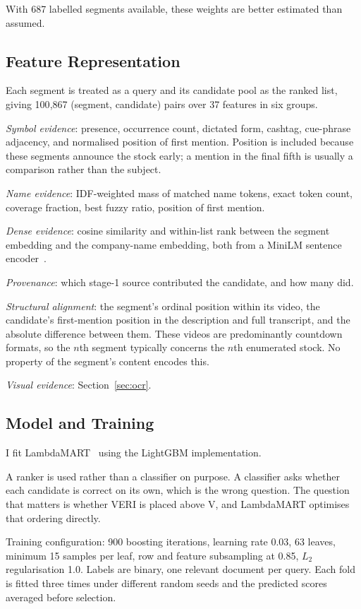 \documentclass[conference]{IEEEtran}
\begin{document}
With 687 labelled segments available, these weights are better estimated than
assumed.

\subsection{Feature Representation}

Each segment is treated as a query and its candidate pool as the ranked list,
giving 100{,}867 (segment, candidate) pairs over 37 features in six groups.

\emph{Symbol evidence}: presence, occurrence count, dictated form, cashtag,
cue-phrase adjacency, and normalised position of first mention. Position is
included because these segments announce the stock early; a mention in the final
fifth is usually a comparison rather than the subject.

\emph{Name evidence}: IDF-weighted mass of matched name tokens, exact token
count, coverage fraction, best fuzzy ratio, position of first mention.

\emph{Dense evidence}: cosine similarity and within-list rank between the
segment embedding and the company-name embedding, both from a MiniLM sentence
encoder~\cite{minilm}.

\emph{Provenance}: which stage-1 source contributed the candidate, and how many
did.

\emph{Structural alignment}: the segment's ordinal position within its video,
the candidate's first-mention position in the description and full transcript,
and the absolute difference between them. These videos are predominantly
countdown formats, so the $n$th segment typically concerns the $n$th enumerated
stock. No property of the segment's content encodes this.

\emph{Visual evidence}: Section~\ref{sec:ocr}.

\subsection{Model and Training}

I fit LambdaMART~\cite{lambdamart} using the LightGBM implementation.

A ranker is used rather than a classifier on purpose. A classifier asks whether
each candidate is correct on its own, which is the wrong question. The question
that matters is whether VERI is placed above V, and LambdaMART optimises that
ordering directly.

Training configuration: 900 boosting iterations, learning rate 0.03, 63 leaves,
minimum 15 samples per leaf, row and feature subsampling at 0.85, $L_2$
regularisation 1.0. Labels are binary, one relevant document per query. Each
fold is fitted three times under different random seeds and the predicted scores
averaged before selection.
\end{document}
